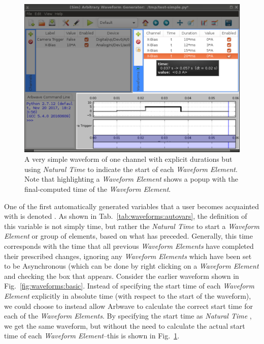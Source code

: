 \begin{figure}[ht!]
  \centerline{\includegraphics[width=.8\textwidth]{figures/basic-waveform_t}}
  \caption[Very simple waveform using \textit{Natural Time} ]{
    A very simple waveform of one channel with explicit durations but using
    \textit{Natural Time} to indicate the start of each \textit{Waveform
    Element}.  Note that highlighting a \textit{Waveform Element} shows a popup
    with the final-computed time of the \textit{Waveform Element}.
  }
  \label{fig:waveforms:basic_t}
\end{figure}

One of the first automatically generated variables that a user becomes
acquainted with is denoted .  As shown in
Tab.~\ref{tab:waveforms:autovars}, the definition of this variable is not simply
time, but rather the \textit{Natural Time} to start a \textit{Waveform Element}
or group of elements, based on what has preceded.  Generally, this time
corresponds with the time that all previous \textit{Waveform Elements} have
completed their prescribed changes, ignoring any \textit{Waveform Elements} which
have been set to be Asynchronous (which can be done by right clicking on a 
\textit{Waveform Element} and checking the box that appears.  Consider the earlier waveform
shown in Fig.~\ref{fig:waveforms:basic}.  Instead of specifying the start time
of each \textit{Waveform Element} explicitly in absolute time (with respect to
the start of the waveform), we could choose to instead allow Arbwave to
calculate the correct start time for each of the \textit{Waveform Elements}.  By
specifying the start time as \textit{Natural Time} , we get
the same waveform, but without the need to calculate the actual start time of
each \textit{Waveform Element}--this is shown in
Fig.~\ref{fig:waveforms:basic_t}.

